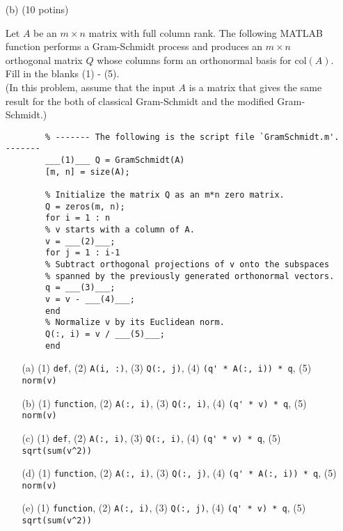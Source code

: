 \documentclass[a4paper,10pt]{article}
\makeatletter
\newlength{\Problen}
\newlength{\Probheadlen}
\newlength{\Probskip}
\newenvironment{ProbK}{\begin{lrbox}{\@syntest}%
    \begin{minipage}\textwidth}{\end{minipage}\end{lrbox}}
\newenvironment{ProbK}[2][]{ %
    \global\setbox\@lastproblem=\vbox\bgroup
    \par\noindent\parbox[t]{\Probheadlen}{\raggedleft\fontsize{10}{10pt}\selectfont
    {\bfseries\large #2 }\\[-1.5mm]
    \rule[1mm]{16mm}{.2mm}\\[-2mm]{\sffamily #1}}\hspace{\Probskip}%
    \begin{minipage}[t]{\Problen}}{\end{minipage}\par\vspace{3mm}\egroup%
    \unvcopy\@lastproblem}
\theoremstyle{remark}
\makeatother
\begin{document}
\vfill \eject

\begin{ProbK}[pt 10]{8}
	\begin{enumerate}
	\item[(b)] (10 potins)
	
	\vspace{1mm}
	
	Let $A$ be an $m \times n$ matrix with full column rank. 
	The following MATLAB function performs a Gram-Schmidt process and produces 
	an $m \times n$ orthogonal matrix $Q$ whose columns form an orthonormal basis for col$(A)$. 
	Fill in the blanks (1) - (5).\\
	(In this problem, assume that the input $A$ is a matrix 
	that gives the same result for the both of classical Gram-Schmidt
	and the modified Gram-Schmidt.)
	
	\vspace{2mm}
	
	\begin{verbatim}
		% ------- The following is the script file `GramSchmidt.m'. -------
		___(1)___ Q = GramSchmidt(A)
		[m, n] = size(A);
		
		% Initialize the matrix Q as an m*n zero matrix.
		Q = zeros(m, n);
		for i = 1 : n
		% v starts with a column of A.
		v = ___(2)___;
		for j = 1 : i-1
		% Subtract orthogonal projections of v onto the subspaces
		% spanned by the previously generated orthonormal vectors.
		q = ___(3)___;
		v = v - ___(4)___;
		end
		% Normalize v by its Euclidean norm.
		Q(:, i) = v / ___(5)___;
		end
	\end{verbatim}
	
	\begin{itemize}
		\item[(a)]
		(1) \verb"def", (2) \verb"A(i, :)", (3) \verb"Q(:, j)", (4) \verb"(q' * A(:, i)) * q", (5) \verb"norm(v)"
		\item[(b)]
		(1) \verb"function", (2) \verb"A(:, i)", (3) \verb"Q(:, i)", (4) \verb"(q' * v) * q", (5) \verb"norm(v)"
		\item[(c)]
		(1) \verb"def", (2) \verb"A(:, i)", (3) \verb"Q(:, i)", (4) \verb"(q' * v) * q", (5) \verb"sqrt(sum(v^2))"
		\item[(d)]
		(1) \verb"function", (2) \verb"A(:, i)", (3) \verb"Q(:, j)", (4) \verb"(q' * A(:, i)) * q", (5) \verb"norm(v)"
		\item[(e)]
		(1) \verb"function", (2) \verb"A(:, i)", (3) \verb"Q(:, j)", (4) \verb"(q' * v) * q", (5) \verb"sqrt(sum(v^2))"
	\end{itemize}
\end{enumerate}
\end{ProbK}

\vfill \eject
\end{document}
